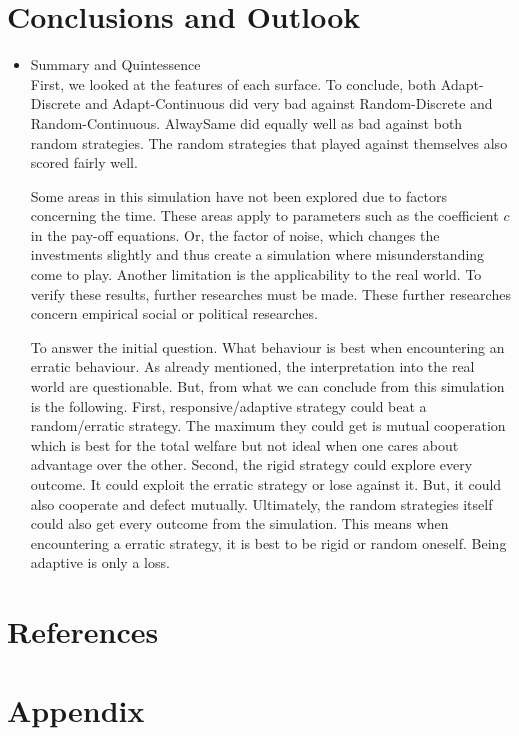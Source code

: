 \documentclass{article}
\begin{document}
\section{Conclusions and Outlook}
\begin{itemize}

	\item Summary and Quintessence\\
		First, we looked at the features of each surface.
		To conclude, both Adapt-Discrete and Adapt-Continuous did very bad against Random-Discrete and Random-Continuous.
		AlwaySame did equally well as bad against both random strategies.
		The random strategies that played against themselves also scored fairly well.

		Some areas in this simulation have not been explored due to factors concerning the time.
		These areas apply to parameters such as the coefficient $c$ in the pay-off equations.
		Or, the factor of noise, which changes the investments slightly and thus create a simulation where misunderstanding come to play.
		Another limitation is the applicability to the real world.
		To verify these results, further researches must be made.
		These further researches concern empirical social or political researches.

		To answer the initial question.
		What behaviour is best when encountering an erratic behaviour.
		As already mentioned, the interpretation into the real world are questionable.
		But, from what we can conclude from this simulation is the following.
		First, responsive/adaptive strategy could beat a random/erratic strategy.
		The maximum they could get is mutual cooperation which is best for the total welfare but not ideal when one cares about advantage over the other.
		Second, the rigid strategy could explore every outcome.
		It could exploit the erratic strategy or lose against it.
		But, it could also cooperate and defect mutually.
		Ultimately, the random strategies itself could also get every outcome from the simulation.
		This means when encountering a erratic strategy, it is best to be rigid or random oneself.
		Being adaptive is only a loss.

\end{itemize}

%
%
%

\section{References}
\section{Appendix}
\end{document}
